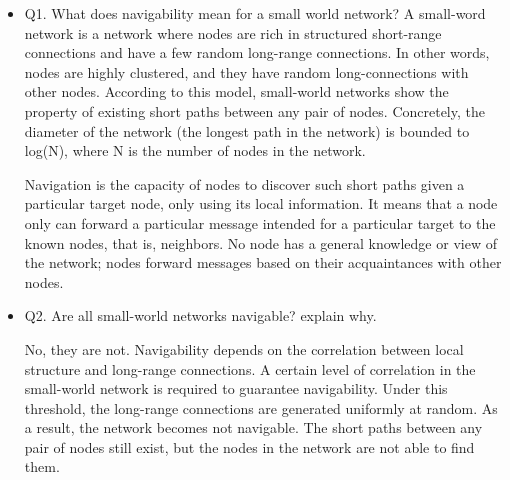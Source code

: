 \documentclass[10pt]{proc}
\begin{document}
\begin{itemize}
 \item Q1.  What does navigability mean for a small world network?
A small-word network is a network where nodes are rich in structured short-range connections and have a few random long-range connections. 
In other words, nodes are highly clustered, and they have random long-connections with other nodes. 
According to this model, small-world networks show the property of existing short paths between any pair of nodes. 
Concretely, the diameter of the network (the longest path in the network) is bounded to log(N), where N is the number of nodes in the network. 

Navigation is the capacity of nodes to discover such short paths given a particular target node, only using its local information. 
It means that a node only can forward a particular message intended for a particular target to the known nodes, that is, neighbors. 
No node has a general knowledge or view of the network; nodes forward messages based on their acquaintances with other nodes.

 \item Q2. Are all small-world networks navigable? explain why.

No, they are not. 
Navigability depends on the correlation between local structure and long-range connections. 
A certain level of correlation in the small-world network is required to guarantee navigability. 
Under this threshold, the long-range connections are generated uniformly at random. 
As a result, the network becomes not navigable. 
The short paths between any pair of nodes still exist, but the nodes in the network are not able to find them. 
\end{itemize}



\end{document}
